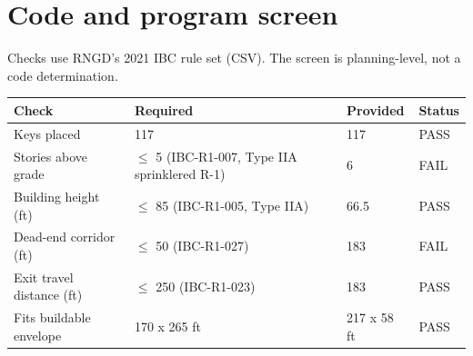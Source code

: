 \documentclass[10pt]{article}
\begin{document}
\section{Code and program screen}
Checks use RNGD's 2021 IBC rule set (CSV). The screen is planning-level, not a code determination.
\begin{longtable}{p{4.4cm}p{5cm}p{3.2cm}l}\toprule Check & Required & Provided & Status \\ \midrule
Keys placed & 117 & 117 & PASS \\
Stories above grade & $\le$ 5 (IBC-R1-007, Type IIA sprinklered R-1) & 6 & FAIL \\
Building height (ft) & $\le$ 85 (IBC-R1-005, Type IIA) & 66.5 & PASS \\
Dead-end corridor (ft) & $\le$ 50 (IBC-R1-027) & 183 & FAIL \\
Exit travel distance (ft) & $\le$ 250 (IBC-R1-023) & 183 & PASS \\
Fits buildable envelope & 170 x 265 ft & 217 x 58 ft & PASS \\
\bottomrule\end{longtable}
\end{document}

